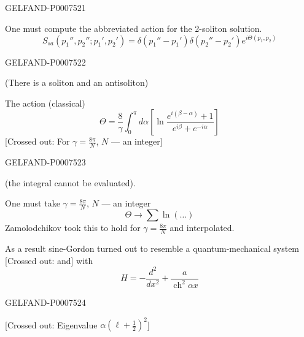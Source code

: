 \begin{GelfandAdjacentEvidence}{GELFAND-P000752}{1}


One must compute the abbreviated action for the 2-soliton solution.
\begin{equation*}
S_{sa}(p_1'',p_2'';p_1',p_2')
=\delta(p_1''-p_1')\delta(p_2''-p_2')e^{i\Theta(p_1,p_2)}
\tag{46}
\end{equation*}
\end{GelfandAdjacentEvidence}
\begin{GelfandAdjacentEvidence}{GELFAND-P000752}{2}

(There is a soliton and an antisoliton)

The action (classical)
\begin{equation*}
\Theta=\frac8\gamma\int_0^\pi d\alpha
\left[\ln\frac{e^{i(\beta-\alpha)}+1}{e^{i\beta}+e^{-i\alpha}}\right]
\tag{47}
\end{equation*}
[Crossed out: For \(\gamma=\frac{8\pi}{N}\), \(N\) --- an integer]
\end{GelfandAdjacentEvidence}
\begin{GelfandAdjacentEvidence}{GELFAND-P000752}{3}

(the integral cannot be evaluated).

One must take \(\gamma=\frac{8\pi}{N}\), \(N\) --- an integer
\begin{equation*}
\Theta\longrightarrow\sum\ln(\ldots)
\tag{48}
\end{equation*}
Zamolodchikov took this to hold for \(\gamma=\frac{8\pi}{N}\) and interpolated.

As a result sine-Gordon turned out to resemble a quantum-mechanical system [Crossed out: and] with
\begin{equation*}
H=-\frac{d^2}{dx^2}+\frac{a}{\operatorname{ch}^2\alpha x}
\tag{49}
\end{equation*}
\end{GelfandAdjacentEvidence}
\begin{GelfandAdjacentEvidence}{GELFAND-P000752}{4}

[Crossed out: Eigenvalue \(\alpha(\ell+\tfrac12)^2\)]
\end{GelfandAdjacentEvidence}
